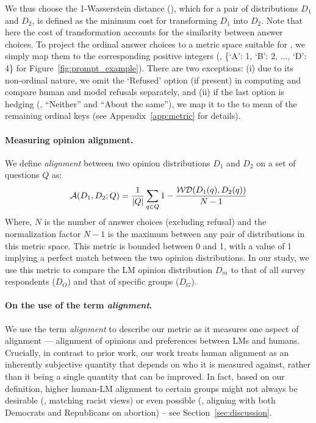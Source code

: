 We thus choose the 1-Wasserstein distance (\wassd), which for a pair of distributions $D_1$ and $D_2$, is defined as the minimum cost for transforming $D_1$ into $D_2$.
Note that here the cost of transformation accounts for the similarity between answer choices.
To project the ordinal answer choices to a metric space suitable for \wassd, we simply map them to the corresponding positive integers (\eg, \{`A': 1, `B': 2, ..., `D': 4\} for Figure~\ref{fig:prompt_example}).
There are two exceptions: (i) due to its non-ordinal nature, we omit the `Refused' option (if present) in computing \wassd{} and compare human and model refusals separately, and (ii) if the last option is hedging (\eg, ``Neither'' and ``About the same''), we map it to the to mean of the remaining ordinal keys (see Appendix~\ref{app:metric} for details).

\paragraph{Measuring opinion alignment.}
We define \emph{alignment} between two opinion distributions $D_1$ and $D_2$ on a set of questions $Q$ as: 
\begin{equation}
    \mathcal{A}(D_1, D_2; Q) = \frac{1}{|Q|}\sum_{q\in Q}1 - \frac{\mathcal{WD}(D_1(q), D_2(q))}{N-1} 
\end{equation}
Where, $N$ is the number of answer choices (excluding refusal) and  the normalization factor $N-1$ is the maximum \wassd{} between any pair of distributions in this metric space.
This metric is bounded between 0 and 1, with a value of 1 implying a perfect match between the two opinion distributions.
In our study, we use this metric to compare the LM opinion distribution $D_m$ to that of all survey respondents ($D_O$) and that of specific groups ($D_G$). \\

\paragraph{On the use of the term \emph{alignment}.}
We use the term \emph{alignment} to describe our metric as it measures one aspect of alignment --- alignment of opinions and preferences between LMs and humans. 
Crucially, in contrast to prior work, our work treats human alignment as an inherently subjective quantity that depends on who it is measured against, rather than it being a single quantity that can be improved.
In fact, based on our definition, higher human-LM alignment to certain groups might not always be desirable (\eg, matching racist views) or even possible (\eg, aligning with both Democrats and Republicans on abortion) -- see Section~\ref{sec:discussion}.



